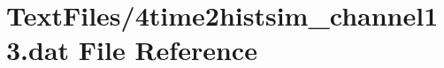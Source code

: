 \hypertarget{4time2histsim__channel13_8dat}{}\section{Text\+Files/4time2histsim\+\_\+channel13.dat File Reference}
\label{4time2histsim__channel13_8dat}

